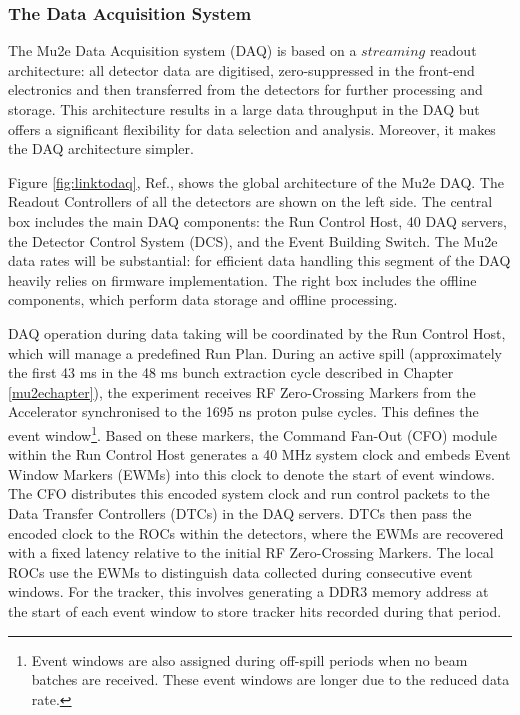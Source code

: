 
\subsubsection{The Data Acquisition System}\label{tdaqtra}

The Mu2e Data Acquisition system (DAQ) is based on a $streaming$ readout architecture: 
all detector data are digitised, zero-suppressed in the front-end electronics 
and then transferred from the detectors for further processing and storage. 
This architecture results in a large data throughput in the DAQ but offers a 
significant flexibility for data selection and analysis. Moreover, it makes 
the DAQ architecture simpler.

Figure \ref{fig:linktodaq}, Ref.\cite{GIOIOSA2023167732}, shows the global 
architecture of the Mu2e DAQ. 
The Readout Controllers of all the detectors are shown 
on the left side. The central box includes the main DAQ 
components: the Run Control Host, 40 DAQ servers, the 
Detector Control System (DCS), and the Event Building 
Switch. The Mu2e data rates will be substantial: for 
efficient data handling this segment of the DAQ heavily 
relies on firmware implementation. The right box includes 
the offline components, which perform data storage and 
offline processing. 

DAQ operation during data taking will be coordinated by the Run Control Host, 
which will manage a predefined Run Plan. During an active spill (approximately the first 
43 ms in the 48 ms bunch extraction cycle described in Chapter \ref{mu2echapter}), 
the experiment receives RF Zero-Crossing Markers from the Accelerator 
synchronised to the 1695 ns proton pulse cycles. This defines the 
event window\footnote{Event windows are also assigned during off-spill periods 
when no beam batches are received. 
These event windows are longer due to the reduced data rate.}. 
Based on these markers, the Command Fan-Out (CFO) module within the 
Run Control Host generates a 40 MHz system clock and embeds Event 
Window Markers (EWMs) into this clock to denote the start of event 
windows. The CFO distributes this encoded system clock and run control 
packets to the Data Transfer Controllers (DTCs) in the DAQ servers. 
DTCs then pass the encoded clock to the ROCs within the detectors, 
where the EWMs are recovered with a fixed latency relative to the 
initial RF Zero-Crossing Markers. The local ROCs use the EWMs to distinguish 
data collected during consecutive event windows. For the tracker, 
this involves generating a DDR3 memory address at the start of each 
event window to store tracker hits recorded during that period. 

